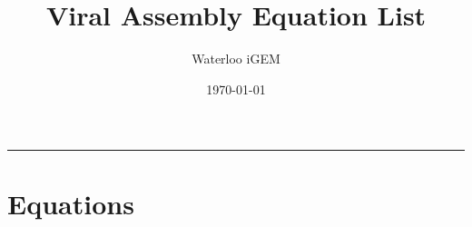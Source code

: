 \documentclass[fontsize=9pt,letter]{scrartcl}
\title{
\horrule{1pt} \\[0.2cm]			%
Viral Assembly Equation List
}
\author{Waterloo iGEM}
\date{\today}
\numberwithin{equation}{section} %
\numberwithin{figure}{section} %
\numberwithin{table}{section} %
\newcommand{\horrule}[1]{\rule{\linewidth}{#1}} %
\begin{document}
\maketitle %
\vspace{-20pt}

\horrule{1pt} %
\vspace{-20pt}



\section{Equations}

\end{document}
